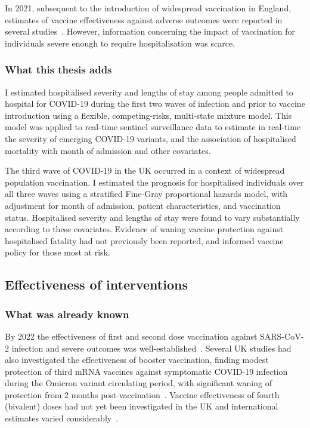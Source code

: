 In 2021, subsequent to the introduction of widespread vaccination in England, estimates of vaccine effectiveness against adverse outcomes were reported in several studies~\parencite{Lopez_Bernal2021-gt, Thygesen2021-kg, UK_Health_Security_Agency2021-gw}. However, information concerning the impact of vaccination for individuals severe enough to require hospitalisation was scarce.

\subsubsection{What this thesis adds}

I estimated hospitalised severity and lengths of stay among people admitted to hospital for COVID-19 during the first two waves of infection and prior to vaccine introduction using a flexible, competing-risks, multi-state mixture model. This model was applied to real-time sentinel surveillance data to estimate in real-time the severity of emerging COVID-19 variants, and the association of hospitalised mortality with month of admission and other covariates.

The third wave of COVID-19 in the UK occurred in a context of widespread population vaccination. I estimated the prognosis for hospitalised individuals over all three waves using a stratified Fine-Gray proportional hazards model, with adjustment for month of admission, patient characteristics, and vaccination status. Hospitalised severity and lengths of stay were found to vary substantially according to these covariates. Evidence of waning vaccine protection against hospitalised fatality had not previously been reported, and informed vaccine policy for those most at risk.

\subsection{Effectiveness of interventions}

\subsubsection{What was already known}

By 2022 the effectiveness of first and second dose vaccination against SARS-CoV-2 infection and severe outcomes was well-established~\parencite{Andrews2022-qd, Hall2022-ep, Goldberg2021-wb}. Several UK studies had also investigated the effectiveness of booster vaccination, finding modest protection of third mRNA vaccines against symptomatic COVID-19 infection during the Omicron variant circulating period, with significant waning of protection from 2 months post-vaccination~\parencite{Hall2024-ai, Andrews2022-af, Kirsebom2022-co}. Vaccine effectiveness of fourth (bivalent) doses had not yet been investigated in the UK and international estimates varied considerably~\parencite{Link-Gelles2023-pt, Shrestha2023-oq}.

